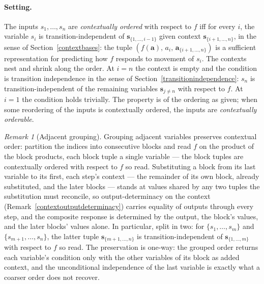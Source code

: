 \documentclass{article}
\theoremstyle{definition}
\theoremstyle{remark}
\newtheorem{remark}[proposition]{Remark}
\begin{document}
\paragraph{Setting.} The inputs $s_1, \ldots, s_n$ are \textit{contextually ordered} with respect to $f$ iff for every $i$, the variable $s_i$ is transition-independent of $\boldsymbol{s}_{\{1, \ldots, i-1\}}$ given context $\boldsymbol{s}_{\{i+1, \ldots, n\}}$, in the sense of Section~\ref{contextbases}: the tuple $(f(\boldsymbol{a}),\, a_i,\, \boldsymbol{a}_{\{i+1, \ldots, n\}})$ is a sufficient representation for predicting how $f$ responds to movement of $s_i$. The contexts nest and shrink along the order. At $i = n$ the context is empty and the condition is transition independence in the sense of Section~\ref{transitionindependence}: $s_n$ is transition-independent of the remaining variables $\boldsymbol{s}_{j \neq n}$ with respect to $f$. At $i = 1$ the condition holds trivially. The property is of the ordering as given; when some reordering of the inputs is contextually ordered, the inputs are \textit{contextually orderable}.

\begin{remark}[Adjacent grouping]
\label{adjacentgrouping}
Grouping adjacent variables preserves contextual order: partition the indices into consecutive blocks and read $f$ on the product of the block products, each block tuple a single variable --- the block tuples are contextually ordered with respect to $f$ so read. Substituting a block from its last variable to its first, each step's context --- the remainder of its own block, already substituted, and the later blocks --- stands at values shared by any two tuples the substitution must reconcile, so output-determinacy on the context (Remark~\ref{contextoutputdeterminacy}) carries equality of outputs through every step, and the composite response is determined by the output, the block's values, and the later blocks' values alone. In particular, split in two: for $\{s_1, \ldots, s_m\}$ and $\{s_{m+1}, \ldots, s_n\}$, the latter tuple $\boldsymbol{s}_{\{m+1, \ldots, n\}}$ is transition-independent of $\boldsymbol{s}_{\{1, \ldots, m\}}$ with respect to $f$ so read. The preservation is one-way: the grouped order returns each variable's condition only with the other variables of its block as added context, and the unconditional independence of the last variable is exactly what a coarser order does not recover.
\end{remark}
\end{document}
